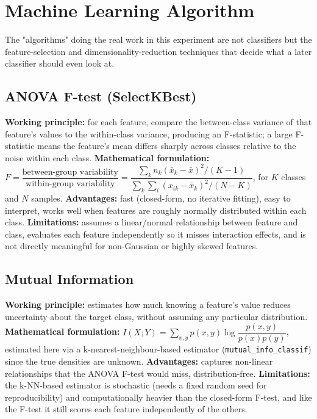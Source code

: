 \documentclass[11pt,a4paper]{article}
\begin{document}
\section{Machine Learning Algorithm}
The "algorithms" doing the real work in this experiment are not classifiers but the feature-selection and dimensionality-reduction techniques that decide what a later classifier should even look at.

\subsection{ANOVA F-test (SelectKBest)}
\textbf{Working principle:} for each feature, compare the between-class variance of that feature's values to the within-class variance, producing an F-statistic; a large F-statistic means the feature's mean differs sharply across classes relative to the noise within each class.
\textbf{Mathematical formulation:} $F = \dfrac{\text{between-group variability}}{\text{within-group variability}} = \dfrac{\sum_k n_k(\bar{x}_k-\bar{x})^2/(K-1)}{\sum_k\sum_i (x_{ik}-\bar{x}_k)^2/(N-K)}$, for $K$ classes and $N$ samples.
\textbf{Advantages:} fast (closed-form, no iterative fitting), easy to interpret, works well when features are roughly normally distributed within each class.
\textbf{Limitations:} assumes a linear/normal relationship between feature and class, evaluates each feature independently so it misses interaction effects, and is not directly meaningful for non-Gaussian or highly skewed features.

\subsection{Mutual Information}
\textbf{Working principle:} estimates how much knowing a feature's value reduces uncertainty about the target class, without assuming any particular distribution.
\textbf{Mathematical formulation:} $I(X;Y) = \sum_{x,y} p(x,y)\log\dfrac{p(x,y)}{p(x)p(y)}$, estimated here via a k-nearest-neighbour-based estimator (\texttt{mutual\_info\_classif}) since the true densities are unknown.
\textbf{Advantages:} captures non-linear relationships that the ANOVA F-test would miss, distribution-free.
\textbf{Limitations:} the k-NN-based estimator is stochastic (needs a fixed random seed for reproducibility) and computationally heavier than the closed-form F-test, and like the F-test it still scores each feature independently of the others.
\end{document}
